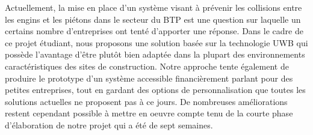 Actuellement, la mise en place d'un système visant à prévenir les collisions entre les engins et les piétons dans le secteur du BTP est une question sur laquelle un certains nombre d'entreprises ont tenté d'apporter une réponse. Dans le cadre de ce projet étudiant, nous proposons une solution basée sur la technologie UWB qui possède l'avantage d'être plutôt bien adaptée dans la plupart des environnements caractéristiques des sites de construction. Notre approche tente également de produire le prototype d'un système accessible financièrement parlant pour des petites entreprises, tout en gardant des options de personnalisation que toutes les solutions actuelles ne proposent pas à ce jours. De nombreuses améliorations restent cependant possible à mettre en oeuvre compte tenu de la courte phase d'élaboration de notre projet qui a été de sept semaines.